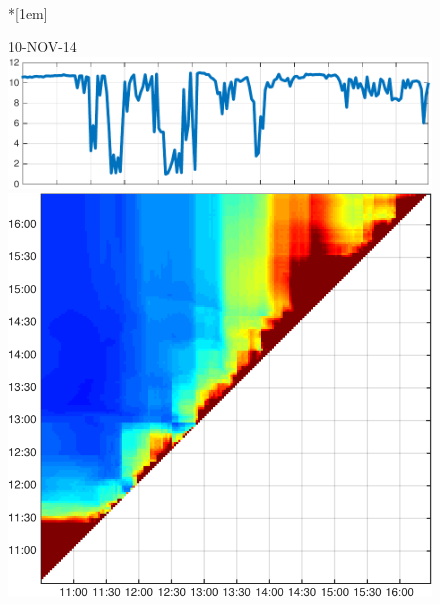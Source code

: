 \begin{figure}
\begin{minipage}[c]{\mylength}
\end{minipage}  \\*[1em]
\begin{minipage}[c]{\mylength}
\centering \scriptsize 10-NOV-14 \\
\includegraphics[valign=t,trim=0 0 5pt 0,angle=90,origin=tr,width=\sunintwidth,totalheight=\eventheight]{events/20141110-intensity.pdf}
\includegraphics[valign=t,width=\eventswidth]{events/20141110-maxGain-local-events.png}

\end{minipage}
\end{figure}
